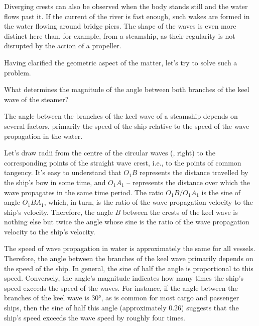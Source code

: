 Diverging crests can also be observed when the body stands still and the water flows past it. If the current of the river is fast enough, such wakes are formed in the water flowing around bridge piers. The shape of the waves is even more distinct here than, for example, from a steamship, as their regularity is not disrupted by the action of a propeller.

Having clarified the geometric aspect of the matter, let's try to solve such a problem.

\ques What determines the magnitude of the angle between both branches of the keel wave of the steamer?

\ans The angle between the branches of the keel wave of a steamship depends on several factors, primarily the speed of the ship relative to the speed of the wave propagation in the water.

Let's draw radii from the centre of the circular waves (, right) to the corresponding points of the straight wave crest, i.e., to the points of common tangency. It's easy to understand that $O_{1}B$ represents the distance travelled by the ship's bow in some time, and $O_{1}A_{1}$ -- represents the distance over which the wave propagates in the same time period. The ratio $O_{1}B/O_{1}A_{1}$ is the sine of angle $O_{1}BA_{1}$, which, in turn, is the ratio of the wave propagation velocity to the ship's velocity. Therefore, the angle $B$ between the crests of the keel wave is nothing else but twice the angle whose sine is the ratio of the wave propagation velocity to the ship's velocity.


The speed of wave propagation in water is approximately the same for all vessels. Therefore, the angle between the branches of the keel wave primarily depends on the speed of the ship. In general, the sine of half the angle is proportional to this speed. Conversely, the angle's magnitude indicates how many times the ship's speed exceeds the speed of the waves. For instance, if the angle between the branches of the keel wave is \ang{30}, as is common for most cargo and passenger ships, then the sine of half this angle (approximately 0.26) suggests that the ship's speed exceeds the wave speed by roughly four times.

